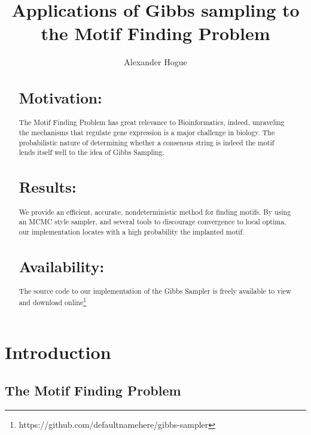 \documentclass{bioinfo}
\begin{document}
\title[Gibbs Sampling]{Applications of Gibbs sampling to the Motif Finding Problem}
\author[Alexander Hogue]{Alexander Hogue}
\address{}
\history{}
\editor{}

\maketitle

\begin{abstract}

\section{Motivation:}
The Motif Finding Problem has great relevance to Bioinformatics, indeed, unraveling the mechanisms that regulate gene expression is a major challenge in biology. The probabilistic nature of determining whether a consensus string is indeed the motif lends itself well to the idea of Gibbs Sampling.
\section{Results:}
We provide an efficient, accurate, nondeterministic method for finding motifs. By using an MCMC style sampler, and several tools to discourage convergence to local optima, our implementation locates with a high probability the implanted motif.
\section{Availability:}
The source code to our implementation of the Gibbs Sampler is freely available to view and download online\footnote{https://github.com/defaultnamehere/gibbs-sampler}
\end{abstract}

\section{Introduction}
\subsection{The Motif Finding Problem}
\end{document}
